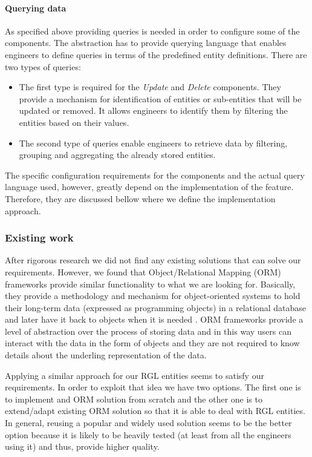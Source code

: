 \paragraph{Querying data}

As specified above providing queries is needed in order to configure some of the components. The abstraction has to provide querying language that enables engineers to define queries in terms of the predefined entity definitions. There are two types of queries:

\begin{itemize}
	\item The first type is required for the \textit{Update} and \textit{Delete} components. They provide a mechanism for identification of entities or sub-entities that will be updated or removed. It allows engineers to identify them by filtering the entities based on their values.
	
	\item The second type of queries enable engineers to retrieve data by filtering, grouping and aggregating the already stored entities.
\end{itemize}

The specific configuration requirements for the components and the actual query language used, however, greatly depend on the implementation of the feature. Therefore, they are discussed bellow where we define the implementation approach.

\subsubsection{Existing work}

After rigorous research we did not find any existing solutions that can solve our requirements. However, we found that Object/Relational Mapping (ORM) frameworks provide similar functionality to what we are looking for. Basically, they provide a methodology and mechanism for object-oriented systems to hold their long-term data (expressed as programming objects) in a relational database and later have it back to objects when it is needed \cite{o2008object}. ORM frameworks provide a level of abstraction over the process of storing data and in this way users can interact with the data in the form of objects and they are not required to know details about the underling representation of the data. 

Applying a similar approach for our RGL entities seems to satisfy our requirements. In order to exploit that idea we have two options. The first one is to implement and ORM solution from scratch and the other one is to extend/adapt existing ORM solution so that it is able to deal with RGL entities. In general, reusing a popular and widely used solution seems to be the better option because it is likely to be heavily tested (at least from all the engineers using it) and thus, provide higher quality. 


